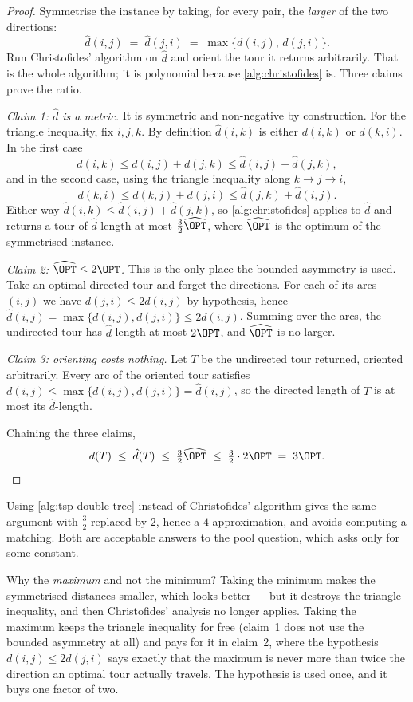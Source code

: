 \begin{proof}
Symmetrise the instance by taking, for every pair, the \emph{larger} of the two
directions:
\[ \hat d(i,j) \;=\; \hat d(j,i) \;=\; \max\{d(i,j),\, d(j,i)\}. \]
Run Christofides' algorithm on $\hat d$ and orient the tour it returns
arbitrarily. That is the whole algorithm; it is polynomial because
\cref{alg:christofides} is. Three claims prove the ratio.

\emph{Claim 1: $\hat d$ is a metric.} It is symmetric and non-negative by
construction. For the triangle inequality, fix $i,j,k$. By definition
$\hat d(i,k)$ is either $d(i,k)$ or $d(k,i)$. In the first case
\[ d(i,k) \le d(i,j) + d(j,k) \le \hat d(i,j) + \hat d(j,k), \]
and in the second case, using the triangle inequality along $k \to j \to i$,
\[ d(k,i) \le d(k,j) + d(j,i) \le \hat d(j,k) + \hat d(i,j). \]
Either way $\hat d(i,k) \le \hat d(i,j) + \hat d(j,k)$, so
\cref{alg:christofides} applies to $\hat d$ and returns a tour of $\hat
d$-length at most $\tfrac32 \widehat{\OPT}$, where $\widehat{\OPT}$ is the
optimum of the symmetrised instance.

\emph{Claim 2: $\widehat{\OPT} \le 2\OPT$.} This is the only place the bounded
asymmetry is used. Take an optimal directed tour and forget the directions. For
each of its arcs $(i,j)$ we have $d(j,i) \le 2 d(i,j)$ by hypothesis, hence
$\hat d(i,j) = \max\{d(i,j),d(j,i)\} \le 2 d(i,j)$. Summing over the arcs, the
undirected tour has $\hat d$-length at most $2\OPT$, and $\widehat{\OPT}$ is no
larger.

\emph{Claim 3: orienting costs nothing.} Let $T$ be the undirected tour
returned, oriented arbitrarily. Every arc of the oriented tour satisfies
$d(i,j) \le \max\{d(i,j),d(j,i)\} = \hat d(i,j)$, so the directed length of $T$
is at most its $\hat d$-length.

Chaining the three claims,
\[ d(T) \;\le\; \hat d(T) \;\le\; \tfrac32 \widehat{\OPT}
        \;\le\; \tfrac32 \cdot 2\OPT \;=\; 3\OPT. \qedhere \]
\end{proof}

Using \cref{alg:tsp-double-tree} instead of Christofides' algorithm gives the
same argument with $\tfrac32$ replaced by $2$, hence a $4$-approximation, and
avoids computing a matching. Both are acceptable answers to the pool question,
which asks only for some constant.

\begin{intuition}
Why the \emph{maximum} and not the minimum? Taking the minimum makes the
symmetrised distances smaller, which looks better --- but it destroys the
triangle inequality, and then Christofides' analysis no longer applies. Taking
the maximum keeps the triangle inequality for free (claim~1 does not use the
bounded asymmetry at all) and pays for it in claim~2, where the hypothesis
$d(i,j) \le 2 d(j,i)$ says exactly that the maximum is never more than twice
the direction an optimal tour actually travels. The hypothesis is used once,
and it buys one factor of two.
\end{intuition}

